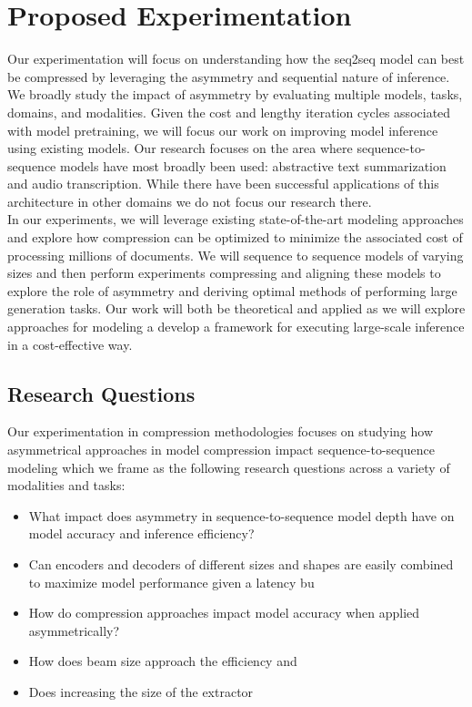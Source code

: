 \section{Proposed Experimentation}
Our experimentation will focus on understanding how the seq2seq model can best be compressed by leveraging the asymmetry and sequential nature of inference.  We broadly study the impact of asymmetry by evaluating multiple models, tasks, domains, and modalities. Given the cost and lengthy iteration cycles associated with model pretraining, we will focus our work on improving model inference using existing models. Our research focuses on the area where sequence-to-sequence models have most broadly been used: abstractive text summarization and audio transcription. While there have been successful applications of this architecture in other domains we do not focus our research there. \\
In our experiments, we will leverage existing state-of-the-art modeling approaches and explore how compression can be optimized to minimize the associated cost of processing millions of documents. We will sequence to sequence models of varying sizes and then perform experiments compressing and aligning these models to explore the role of asymmetry and deriving optimal methods of performing large generation tasks. Our work will both be theoretical and applied as we will explore approaches for modeling a develop a framework for executing large-scale inference in a cost-effective way. 
\subsection{Research Questions}
Our experimentation in compression methodologies focuses on studying how asymmetrical approaches in model compression impact sequence-to-sequence modeling which we frame as the following research questions across a variety of modalities and tasks:
\begin{itemize}
\item What impact does asymmetry in sequence-to-sequence model depth have on model accuracy and inference efficiency?
\item Can encoders and decoders of different sizes and shapes are easily combined to maximize model performance given a latency bu
\item How do compression approaches impact model accuracy when applied asymmetrically?
\item How does beam size approach the efficiency and 
\item Does increasing the size of the extractor 
\end{itemize}
